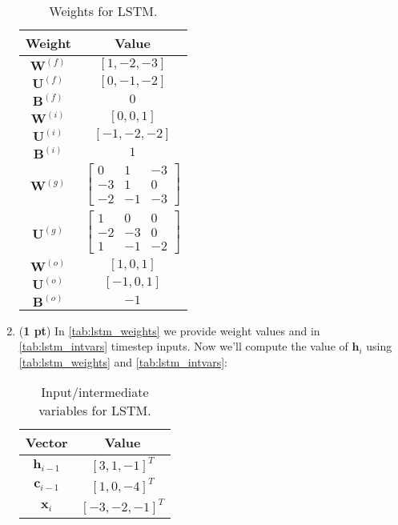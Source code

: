\documentclass[11pt, letterpaper]{article}
\begin{document}
\begin{enumerate}[label=(\alph*)]

\begin{table}[h]
    \centering
    \begin{tabular}{|cc|}
    \toprule
    \textbf{Weight} & \textbf{Value} \\
    \midrule
    $\mathbf{W}^{(f)}$ & $[1,-2,-3]$ \\
    $\mathbf{U}^{(f)}$ & $[0,-1,-2]$ \\
    $\mathbf{B}^{(f)}$ & $0$ \\
    $\mathbf{W}^{(i)}$ & $[0,0,1]$\\
    $\mathbf{U}^{(i)}$ & $[-1,-2,-2]$\\
    $\mathbf{B}^{(i)}$ & $1$ \\
    $\mathbf{W}^{(g)}$ & $\begin{bmatrix}
    0 & 1 & -3\\
    -3 & 1 & 0\\
    -2 & -1 & -3
        \end{bmatrix}$ \\
    $\mathbf{U}^{(g)}$ & $\begin{bmatrix}
    1 & 0 & 0 \\
    -2 & -3 & 0\\
    1 & -1 & -2 \end{bmatrix}$ \\
    $\mathbf{W}^{(o)}$ & $[1,0,1]$\\
    $\mathbf{U}^{(o)}$ & $[-1,0,1]$\\
    $\mathbf{B}^{(o)}$ & $-1$ \\
    \bottomrule
    \end{tabular}
    \caption{Weights for LSTM.}
    \label{tab:lstm_weights}
\end{table}

\newpage

\item (\textbf{1 pt}) In \autoref{tab:lstm_weights} we provide weight values and in \autoref{tab:lstm_intvars} timestep inputs. Now we'll compute the value of $\boldsymbol{h}_{i}$ using \autoref{tab:lstm_weights} and \autoref{tab:lstm_intvars}: 

\begin{table}[h!]
    \centering
    \begin{tabular}{|cc|}
    \toprule
    \textbf{Vector} & \textbf{Value} \\
    \midrule
    $\boldsymbol{h}_{i-1}$ & $[3,1,-1]^T$ \\
    $\boldsymbol{c}_{i-1}$ & $[1,0,-4]^T$ \\
    $\boldsymbol{x}_{i}$ & $[-3,-2,-1]^T$ \\
    \bottomrule
    \end{tabular}
    \caption{Input/intermediate variables for LSTM.}
    \label{tab:lstm_intvars}
\end{table}



\end{enumerate}
\end{document}
